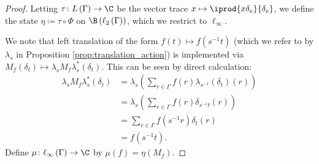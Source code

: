 \begin{proof}
  Letting $\tau\colon L\left( \Gamma \right)\rightarrow \C$ be the vector trace $x\mapsto \iprod{x\delta_e}{\delta_e}$, we define the state $\eta\coloneq \tau\circ \Phi$ on $\B\left( \ell_2\left( \Gamma \right) \right)$, which we restrict to $\ell_{\infty}$.\newline

  We note that left translation of the form $f(t) \mapsto f\left( s^{-1}t \right)$ (which we refer to by $\lambda_s$ in Proposition \ref{prop:translation_action}) is implemented via $M_{f}(\delta_t) \mapsto \lambda_{s}M_f\lambda_{s}^{\ast}\left( \delta_t \right)$. This can be seen by direct calculation:
  \begin{align*}
    \lambda_sM_f\lambda_s^{\ast}\left( \delta_t \right) &= \lambda_s\left( \sum_{r\in\Gamma}f(r)\lambda_{s^{-1}}\left( \delta_t \right) \left( r \right) \right)\\
                                                        &= \lambda_s\left( \sum_{r\in\Gamma}f(r)\delta_{s^{-1}t}(r) \right)\\
                                                        &= \sum_{r\in\Gamma}f\left( s^{-1}r \right)\delta_t(r)\\
                                                        &= f\left( s^{-1}t \right).
  \end{align*}
  Define $\mu\colon \ell_{\infty}\left( \Gamma \right)\rightarrow \C$ by $\mu\left( f \right) = \eta\left( M_f \right)$.\newline


\end{proof}
